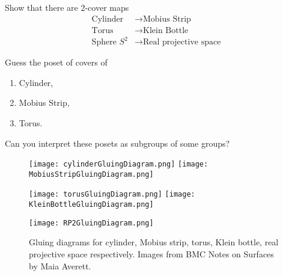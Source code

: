   \begin{qbox}
    Show that there are 2-cover maps
    \begin{align*}
      \mbox{Cylinder} &\longrightarrow \mbox{Mobius Strip} \\
      \mbox{Torus} &\longrightarrow \mbox{Klein Bottle} \\
      \mbox{Sphere } S^2 &\longrightarrow \mbox{Real projective space}
    \end{align*}
  \end{qbox}

  \begin{qbox}
    Guess the poset of covers of
    \begin{enumerate}
      \item Cylinder,
      \item Mobius Strip,
      \item Torus.
    \end{enumerate}
    Can you interpret these posets as subgroups of some groups?
  \end{qbox}


  \begin{figure}[p]
    \centering
    \texttt{[image: cylinderGluingDiagram.png]}
    \texttt{[image: MobiusStripGluingDiagram.png]}

    \texttt{[image: torusGluingDiagram.png]}
    \texttt{[image: KleinBottleGluingDiagram.png]}

    \texttt{[image: RP2GluingDiagram.png]}
    \caption{Gluing diagrams for cylinder, Mobius strip, torus, Klein bottle, real projective space respectively. Images from BMC Notes on Surfaces by Maia Averett.}
    \label{fig:GluingDiagrams}
  \end{figure}
